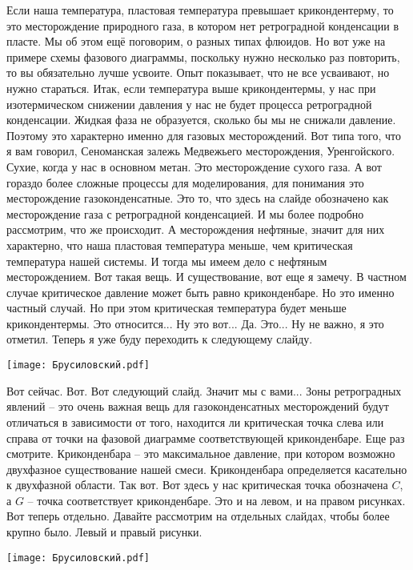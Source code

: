 \documentclass[main.tex]{subfiles}
\begin{document}
Если наша температура, пластовая температура превышает крикондентерму, то это месторождение природного газа, в котором нет ретроградной конденсации в пласте.
Мы об этом ещё поговорим, о разных типах флюидов.
Но вот уже на примере схемы фазового диаграммы, поскольку нужно несколько раз повторить, то вы обязательно лучше усвоите.
Опыт показывает, что не все усваивают, но нужно стараться.
Итак, если температура выше крикондентермы, у нас при изотермическом снижении давления у нас не будет процесса ретроградной конденсации.
Жидкая фаза не образуется, сколько бы мы не снижали
давление.
Поэтому это характерно именно для газовых месторождений.
Вот типа того, что я вам говорил, Сеноманская залежь Медвежьего месторождения, Уренгойского.
Сухие, когда у нас в основном метан.
Это месторождение сухого газа.
А вот гораздо более сложные процессы для моделирования, для понимания это месторождение газоконденсатные.
Это то, что здесь на слайде обозначено как месторождение газа с ретроградной конденсацией.
И мы более подробно рассмотрим, что же происходит.
А месторождения нефтяные, значит для них характерно, что наша пластовая температура меньше, чем критическая температура нашей системы.
И тогда мы имеем дело с нефтяным месторождением.
Вот такая вещь.
И существование, вот еще я замечу.
В частном случае критическое давление может быть равно криконденбаре.
Но это именно частный случай.
Но при этом критическая температура будет меньше крикондентермы.
Это относится...
Ну это вот...
Да.
Это...
Ну не важно, я это отметил.
Теперь я уже буду переходить к следующему слайду.

\begin{center}
\texttt{[image: Брусиловский.pdf]}
\end{center}

Вот сейчас.
Вот.
Вот следующий слайд.
Значит мы с вами...
Зоны ретроградных явлений -- это очень важная вещь для газоконденсатных месторождений будут отличаться в зависимости от того, находится ли критическая точка слева или справа от точки на фазовой диаграмме соответствующей криконденбаре.
Еще раз смотрите.
Криконденбара -- это максимальное давление, при котором возможно двухфазное существование нашей смеси.
Криконденбара определяется касательно к двухфазной области.
Так вот.
Вот здесь у нас критическая точка обозначена $C$, а $G$ -- точка соответствует криконденбаре.
Это и на левом, и на правом рисунках.
Вот теперь отдельно.
Давайте рассмотрим на отдельных слайдах, чтобы более крупно
было.
Левый и правый рисунки.

\begin{center}
\texttt{[image: Брусиловский.pdf]}
\end{center}
\end{document}
